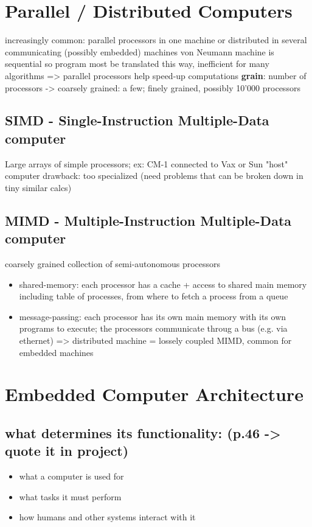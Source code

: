 \documentclass[11pt]{article}
\begin{document}
\section{Parallel / Distributed Computers}
\label{sec:org4f33a49}
increasingly common: parallel processors in one machine or distributed in
several communicating (possibly embedded) machines
von Neumann machine is sequential so program most be translated this way,
inefficient for many algorithms => parallel processors help speed-up computations
\textbf{grain}: number of processors -> coarsely grained: a few; finely grained, possibly 10'000 processors
\subsection{SIMD - Single-Instruction Multiple-Data computer}
\label{sec:org109cccc}
Large arrays of simple processors; ex: CM-1 connected to Vax or Sun "host" computer 
drawback: too specialized (need problems that can be broken down in tiny
similar calcs)
\subsection{MIMD - Multiple-Instruction Multiple-Data computer}
\label{sec:org0626d2e}
coarsely grained collection of semi-autonomous processors
\begin{itemize}
\item shared-memory: each processor has a cache + access to shared main memory
including table of processes, from where to fetch a process from a queue
\item message-passing: each processor has its own main memory with its own
programs to execute; the processors communicate throug a bus (e.g. via
ethernet)
=> distributed machine = lossely coupled MIMD, common for embedded machines
\end{itemize}
\section{Embedded Computer Architecture}
\label{sec:orgb6b4ec9}
\subsection{what determines its functionality: (p.46 -> quote it in project)}
\label{sec:orgd3841bd}
\begin{itemize}
\item what a computer is used for
\item what tasks it must perform
\item how humans and other systems interact with it
\end{itemize}
\end{document}
